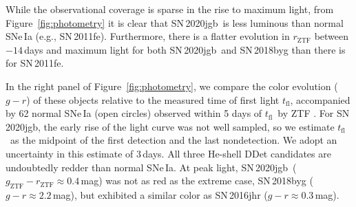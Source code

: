 \documentclass[twocolumn]{aastex631}
\newcommand{\sn}{SN\,2020jgb}
\newcommand{\tfl}{$t_\mathrm{fl}$}
\begin{document}
\begin{CJK*}{UTF8}{gbsn}
While the observational coverage is sparse in the rise to maximum light, from Figure~\ref{fig:photometry} it is clear that \sn\ is less luminous than normal SNe\,Ia (e.g., SN\,2011fe). Furthermore, there is a flatter evolution in $r_\mathrm{ZTF}$ between $-14$\,days and maximum light for both \sn\ and SN\,2018byg than there is for SN\,2011fe.  

In the right panel of Figure~\ref{fig:photometry}, we compare the color evolution ($g-r$) of these objects relative to the measured time of first light \tfl, accompanied by 62 normal SNe\,Ia (open circles) observed within 5 days of \tfl\ by ZTF \citep[from][]{Bulla2020}. For \sn, the early rise of the light curve was not well sampled, so we estimate \tfl\ as the midpoint of the first detection and the last nondetection. We adopt an uncertainty in this estimate of 3\,days. All three He-shell DDet candidates are undoubtedly redder than normal SNe\,Ia. At peak light, \sn\ ($g_\mathrm{ZTF}-r_\mathrm{ZTF}\approx0.4$\,mag) was not as red as the extreme case, SN\,2018byg ($g-r\approx2.2$\,mag), but exhibited a similar color as SN\,2016jhr ($g-r\approx0.3$\,mag).


\end{CJK*}
\end{document}
